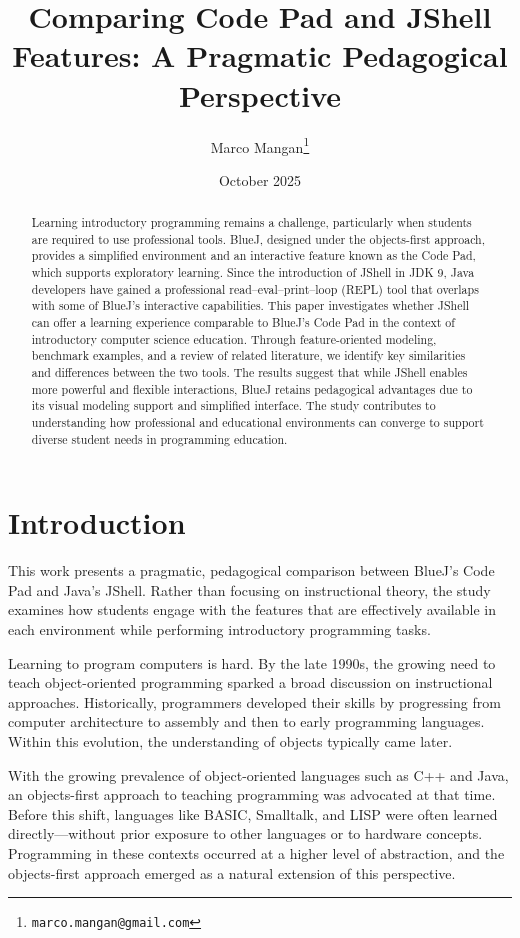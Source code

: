 \documentclass{article}
\title{Comparing Code Pad and JShell Features: A Pragmatic Pedagogical Perspective}
\author{Marco Mangan\thanks{\texttt{marco.mangan@gmail.com}}}
\date{October 2025}
\begin{document}
\maketitle

\begin{abstract}
Learning introductory programming remains a challenge, particularly when students are required to use professional tools. BlueJ, designed under the objects-first approach, provides a simplified environment and an interactive feature known as the Code Pad, which supports exploratory learning. Since the introduction of JShell in JDK 9, Java developers have gained a professional read–eval–print–loop (REPL) tool that overlaps with some of BlueJ’s interactive capabilities. This paper investigates whether JShell can offer a learning experience comparable to BlueJ’s Code Pad in the context of introductory computer science education. Through feature-oriented modeling, benchmark examples, and a review of related literature, we identify key similarities and differences between the two tools. The results suggest that while JShell enables more powerful and flexible interactions, BlueJ retains pedagogical advantages due to its visual modeling support and simplified interface. The study contributes to understanding how professional and educational environments can converge to support diverse student needs in programming education.
\end{abstract}

\section{Introduction}

This work presents a pragmatic, pedagogical comparison between BlueJ’s Code Pad and Java’s JShell. Rather than focusing on instructional theory, the study examines how students engage with the features that are effectively available in each environment while performing introductory programming tasks.

Learning to program computers is hard. By the late 1990s, the growing need to teach object-oriented programming sparked a broad discussion on instructional approaches. Historically, programmers developed their skills by progressing from computer architecture to assembly and then to early programming languages. Within this evolution, the understanding of objects typically came later.

With the growing prevalence of object-oriented languages such as C++ and Java, an objects-first approach to teaching programming was advocated at that time. Before this shift, languages like BASIC, Smalltalk, and LISP were often learned directly—without prior exposure to other languages or to hardware concepts. Programming in these contexts occurred at a higher level of abstraction, and the objects-first approach emerged as a natural extension of this perspective.
\end{document}

